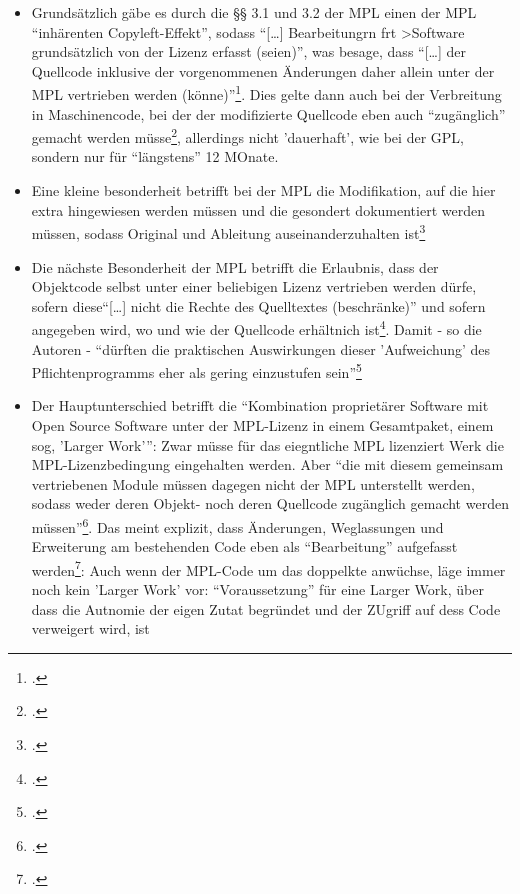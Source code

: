 \documentclass[DIV=calc,BCOR=5mm,11pt,headings=small,oneside,abstract=true, toc=bib]{scrartcl}
\begin{document}
\begin{itemize}
  \item Grundsätzlich gäbe es durch die §§ 3.1 und 3.2 der MPL einen der MPL
  \enquote{inhärenten Copyleft-Effekt}, sodass \enquote{[\ldots]
  Bearbeitungrn frt >Software grundsätzlich von der Lizenz erfasst
  (seien)}, was besage, dass \enquote{[\ldots] der Quellcode
  inklusive der vorgenommenen Änderungen daher allein unter der MPL
  vertrieben werden (könne)}\footcite[vgl.][349]{ArlBriVol2004a}. Dies
  gelte dann auch bei der Verbreitung in Maschinencode, bei der der modifizierte
  Quellcode eben auch \enquote{zugänglich} gemacht werden
  müsse\footcite[vgl.][349]{ArlBriVol2004a}, allerdings nicht 'dauerhaft', wie
  bei der GPL, sondern nur für \enquote{längstens} 12 MOnate.
  \item Eine kleine besonderheit betrifft bei der MPL die Modifikation, auf die
  hier extra hingewiesen werden müssen und die gesondert dokumentiert werden
  müssen, sodass Original und Ableitung auseinanderzuhalten
  ist\footcite[vgl.][350]{ArlBriVol2004a}
  \item Die nächste Besonderheit der MPL betrifft die Erlaubnis, dass der
  Objektcode selbst unter einer beliebigen Lizenz vertrieben werden dürfe,
  sofern diese\enquote{[\ldots] nicht die Rechte des Quelltextes
  (beschränke)} und sofern angegeben wird, wo und wie der Quellcode
  erhältnich ist\footcite[vgl.][350]{ArlBriVol2004a}. Damit - so die Autoren -
 \enquote{dürften die praktischen Auswirkungen dieser 'Aufweichung' des
 Pflichtenprogramms eher als gering einzustufen
 sein}\footcite[vgl.][351]{ArlBriVol2004a}
 \item Der Hauptunterschied betrifft die \enquote{Kombination proprietärer
 Software mit Open Source Software unter der MPL-Lizenz in einem
 Gesamtpaket, einem sog, 'Larger Work'}: Zwar müsse für das eiegntliche
 MPL lizenziert Werk die MPL-Lizenzbedingung eingehalten werden. Aber
 \enquote{die mit diesem gemeinsam vertriebenen Module müssen dagegen nicht
 der MPL unterstellt werden, sodass weder deren Objekt- noch deren
 Quellcode zugänglich gemacht werden
 müssen}\footcite[vgl.][352]{ArlBriVol2004a}. Das meint explizit, dass
 Änderungen, Weglassungen und Erweiterung am bestehenden Code eben als
 \enquote{Bearbeitung} aufgefasst
 werden\footcite[vgl.][354]{ArlBriVol2004a}: Auch wenn der MPL-Code um das
 doppelkte anwüchse, läge immer noch kein 'Larger Work' vor:
 \enquote{Voraussetzung} für eine Larger Work, über dass die Autnomie der
 eigen Zutat begründet und der ZUgriff auf dess Code verweigert wird, ist

\end{itemize}
\end{document}
